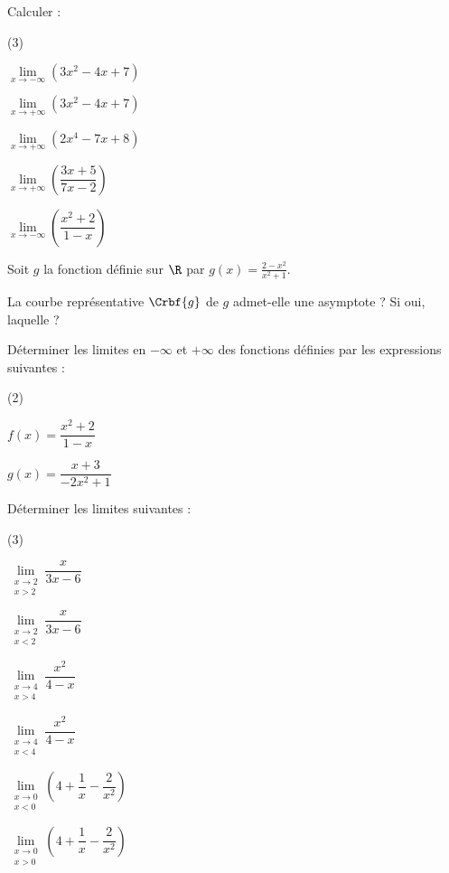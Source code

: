 \begin{exr}
Calculer :

\begin{enumerate-}(3)
\item $\lim\limits_{x\rightarrow -\infty}\left(3x^2-4x+7\right)$
\item $\lim\limits_{x\rightarrow +\infty}\left(3x^2-4x+7\right)$
\item $\lim\limits_{x\rightarrow +\infty}\left(2x^4-7x+8\right)$
\item $\lim\limits_{x\rightarrow +\infty}\left(\dfrac{3x+5}{7x-2}\right)$
\item $\lim\limits_{x\rightarrow -\infty}\left(\dfrac{x^2+2}{1-x}\right)$
\end{enumerate-}
\end{exr}

\begin{exr}
Soit $g$ la fonction définie sur $\R$ par $g(x)=\frac{2-x^2}{x^2+1}$.

La courbe représentative $\Crbf{g}$ de $g$ admet-elle une asymptote ? Si oui, laquelle ?
\end{exr}

\begin{exr}
Déterminer les limites en $-\infty$ et $+\infty$ des fonctions définies par les expressions suivantes :

\begin{enumerate-}[label=\alph*.](2)
\item $f(x)=\dfrac{x^2+2}{1-x}$
\item $g(x)=\dfrac{x+3}{-2x^2+1}$
\end{enumerate-}
\end{exr}

\begin{exr}Déterminer les limites suivantes :

\begin{enumerate-}[label=\alph*.](3)
\item $\lim\limits_{\substack{x\rightarrow 2\\x>2}}\dfrac{x}{3x-6}$
\item $\lim\limits_{\substack{x\rightarrow 2\\x<2}}\dfrac{x}{3x-6}$
\item $\lim\limits_{\substack{x\rightarrow 4\\x>4}}\dfrac{x^2}{4-x}$
\item $\lim\limits_{\substack{x\rightarrow 4\\x<4}}\dfrac{x^2}{4-x}$
\item $\lim\limits_{\substack{x\rightarrow 0\\x<0}}\left(4+\dfrac{1}{x}-\dfrac{2}{x^2}\right)$
\item $\lim\limits_{\substack{x\rightarrow 0\\x>0}}\left(4+\dfrac{1}{x}-\dfrac{2}{x^2}\right)$
\end{enumerate-}
\end{exr}

